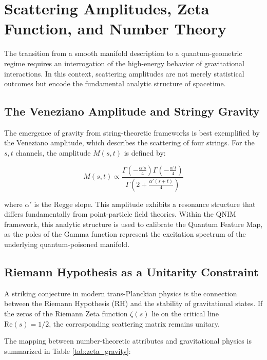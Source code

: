 \documentclass[11pt,a4paper,spanish]{book}
\numberwithin{equation}{chapter}
\numberwithin{figure}{chapter}
\numberwithin{equation}{chapter}
\numberwithin{figure}{chapter}
\numberwithin{table}{chapter}
\begin{document}
\section{Scattering Amplitudes, Zeta Function, and Number Theory}

The transition from a smooth manifold description to a quantum-geometric regime requires an interrogation of the high-energy behavior of gravitational interactions. In this context, scattering amplitudes are not merely statistical outcomes but encode the fundamental analytic structure of spacetime.

\subsection{The Veneziano Amplitude and Stringy Gravity}

The emergence of gravity from string-theoretic frameworks is best exemplified by the Veneziano amplitude, which describes the scattering of four strings. For the $s, t$ channels, the amplitude $M(s,t)$ is defined by:

\begin{equation}
M(s,t) \propto \frac{\Gamma\left(-\frac{\alpha' s}{4}\right)\Gamma\left(-\frac{\alpha' t}{4}\right)}{\Gamma\left(2 + \frac{\alpha'(s+t)}{4}\right)}
\end{equation}

where $\alpha'$ is the Regge slope. This amplitude exhibits a resonance structure that differs fundamentally from point-particle field theories. Within the QNIM framework, this analytic structure is used to calibrate the Quantum Feature Map, as the poles of the Gamma function represent the excitation spectrum of the underlying quantum-poisoned manifold.

\subsection{Riemann Hypothesis as a Unitarity Constraint}

A striking conjecture in modern trans-Planckian physics is the connection between the Riemann Hypothesis (RH) and the stability of gravitational states. If the zeros of the Riemann Zeta function $\zeta(s)$ lie on the critical line $\text{Re}(s) = 1/2$, the corresponding scattering matrix remains unitary. 

The mapping between number-theoretic attributes and gravitational physics is summarized in Table \ref{tab:zeta_gravity}:
\end{document}
